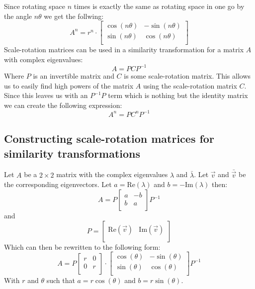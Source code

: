 \documentclass[11pt, a4paper]{article}
\newcommand*{\Rea}{\ensuremath{\text{Re}}}
\newcommand*{\Ima}{\ensuremath{\text{Im}}}
\begin{document}
Since rotating space $n$ times is exactly the same as rotating space in one go by the angle $n\theta$ we get the follwing:
\begin{equation}
  A^n =
  r^n \cdot
  \begin{bmatrix}
    \cos(n \theta) & -\sin(n \theta)\\
    \sin(n \theta) & \cos(n \theta)\\
  \end{bmatrix}
\end{equation}
Scale-rotation matrices can be used in a similarity transformation for a matrix $A$ with complex eigenvalues:
\begin{equation}
  A = PCP^{-1}
\end{equation}
Where $P$ is an invertible matrix and $C$ is some scale-rotation matrix. This allows us to easily find high powers of the matrix $A$ using the scale-rotation matrix $C$. Since this leaves us with an $P^{-1}P$ term which is nothing but the identity matrix we can create the following expression:
\begin{equation}
  A^n = PC^nP^{-1}
\end{equation}


\subsection{Constructing scale-rotation matrices for similarity transformations}
Let $A$ be a $2 \times 2$ matrix with the complex eigenvalues $\lambda$ and $\bar{\lambda}$. Let $\vec{v}$ and $\bar{\vec{v}}$ be the corresponding eigenvectors. Let $a = \Rea(\lambda)$ and $b=-\Ima(\lambda)$ then:
\begin{equation}
  A = P
  \begin{bmatrix}
    a & -b\\
    b & a\\
  \end{bmatrix}
  P^{-1}
\end{equation}
and
\begin{equation}
  P = 
  \begin{bmatrix}
    \Rea(\vec{v}) & \Ima(\vec{v})\\
  \end{bmatrix}
\end{equation}
Which can then be rewritten to the following form:
\begin{equation}
  A = P
  \begin{bmatrix}
    r & 0\\
    0 & r\\
  \end{bmatrix}
  \cdot
  \begin{bmatrix}
    \cos(\theta) & -\sin(\theta)\\
    \sin(\theta) & \cos(\theta)\\
  \end{bmatrix}
  P^{-1}
\end{equation}
With $r$ and $\theta$ such that $a = r\cos(\theta)$ and $b = r\sin(\theta)$.
\end{document}
